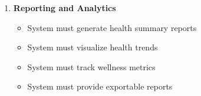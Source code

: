 \begin{enumerate}
    \item \textbf{Reporting and Analytics}
    \begin{itemize}
        \item System must generate health summary reports
        \item System must visualize health trends
        \item System must track wellness metrics
        \item System must provide exportable reports
    \end{itemize}
\end{enumerate} 